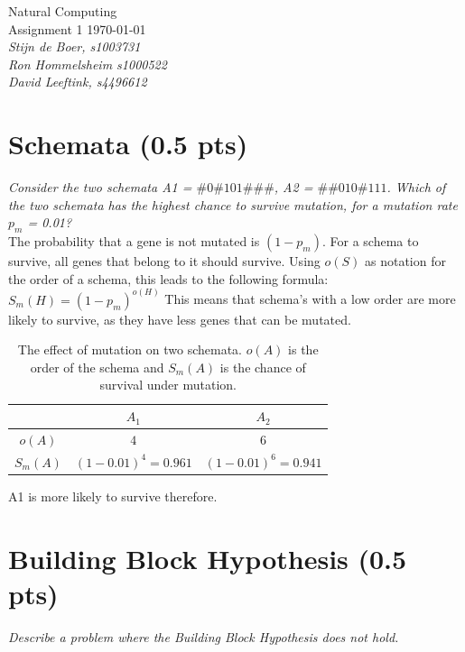 \documentclass{article}
\date{\today}
\begin{document}
\begin{flushright}
Natural Computing \\ 
Assignment 1 \today \\ 
\emph{Stijn de Boer, \textit{s1003731} \\ Ron Hommelsheim \textit{s1000522} \\  David Leeftink, \textit{s4496612} }\\\end{flushright}

\section{Schemata (0.5 pts)}
\textit{Consider the two schemata A1 = $\#0\#101\#\#\#$, A2 =
$\#\#010\#111$. Which of the two schemata has the highest chance to survive mutation, for a mutation rate $p_m$ = 0.01?} \\ 

The probability that a gene is not mutated is $(1-p_m)$. For a schema to survive, all genes that belong to it should survive. Using $o(S)$ as notation for the order of a schema, this leads to the following formula: $S_m(H)=(1-p_m)^{o(H)}$
This means that schema's with a low order are more likely to survive, as they have less genes that can be mutated.

\begin{table}[H]
    \centering
    \begin{tabular}{|c|c|c|}
        \hline
                 & $A_1$                  &          $A_2$         \\ \hline \hline
        $o(A)$   & $4$                    & $6$                    \\ \hline
        $S_m(A)$ & $(1-0.01)^4 = 0.961$   & $(1-0.01)^6 = 0.941$   \\ \hline
    \end{tabular}
    
\caption{The effect of mutation on two schemata. $o(A)$ is the order of the schema and $S_m(A)$ is the chance of survival under mutation.}
\label{tab:mut}
\end{table}
A1 is more likely to survive therefore.


\section{Building Block Hypothesis (0.5 pts)}
\textit{Describe a problem where the Building Block Hypothesis does not hold.} \\
\end{document}
